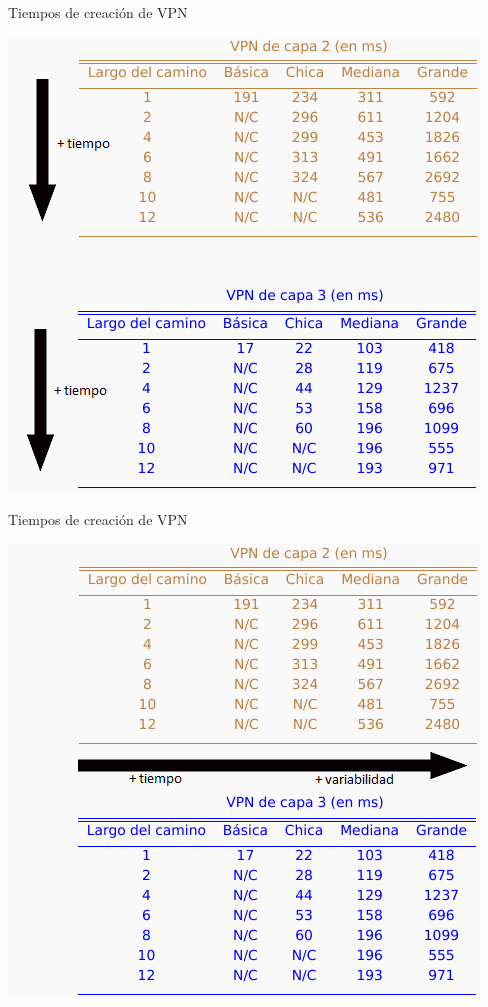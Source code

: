 \documentclass[xcolor=svgnames]{beamer}
\begin{document}
\begin{frame}{Tiempos de creación de VPN}
	\begin{center}
		\includegraphics[height=0.9\textheight]{tiempos_vpn_camino}
	\end{center}
\end{frame}

\begin{frame}{Tiempos de creación de VPN}
	\begin{center}
		\includegraphics[height=0.9\textheight]{tiempos_vpn_topologia}
	\end{center}
\end{frame}
\end{document}
